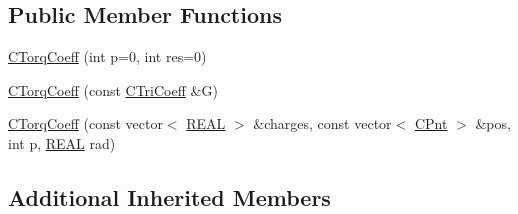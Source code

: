\subsection*{Public Member Functions}
\begin{DoxyCompactItemize}
\item 
\hyperlink{classCTorqCoeff_a90a2461575ac37a67b70a6b2c3817cf6}{C\-Torq\-Coeff} (int p=0, int res=0)
\item 
\hyperlink{classCTorqCoeff_a247c0abd740c28780ceba265b1201c15}{C\-Torq\-Coeff} (const \hyperlink{classCTriCoeff}{C\-Tri\-Coeff} \&G)
\item 
\hyperlink{classCTorqCoeff_a4c2700efbae3670b13ed1bcea4d990a8}{C\-Torq\-Coeff} (const vector$<$ \hyperlink{util_8h_a5821460e95a0800cf9f24c38915cbbde}{R\-E\-A\-L} $>$ \&charges, const vector$<$ \hyperlink{classCPnt}{C\-Pnt} $>$ \&pos, int p, \hyperlink{util_8h_a5821460e95a0800cf9f24c38915cbbde}{R\-E\-A\-L} rad)
\end{DoxyCompactItemize}
\subsection*{Additional Inherited Members}


